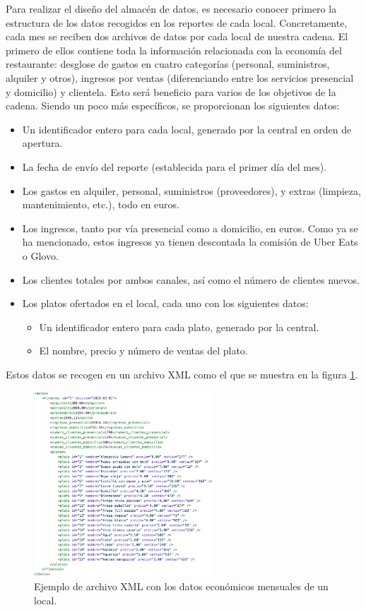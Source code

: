 \documentclass[12pt]{opticajnl}
\begin{document}
Para realizar el diseño del almacén de datos, es necesario conocer primero la estructura de los datos recogidos en los reportes de cada local. Concretamente, cada mes se reciben dos archivos de datos por cada local de nuestra cadena. El primero de ellos contiene toda la información relacionada con la economía del restaurante: desglose de gastos en cuatro categorías (personal, suministros, alquiler y otros), ingresos por ventas (diferenciando entre los servicios presencial y domicilio) y clientela. Esto será beneficio para varios de los objetivos de la cadena. Siendo un poco más específicos, se proporcionan los siguientes datos:
\begin{itemize}
\item Un identificador entero para cada local, generado por la central en orden de apertura.
\item La fecha de envío del reporte (establecida para el primer día del mes). 
\item Los gastos en alquiler, personal, suministros (proveedores), y extras (limpieza, mantenimiento, etc.), todo en euros.
\item Los ingresos, tanto por vía presencial como a domicilio, en euros. Como ya se ha mencionado, estos ingresos ya tienen descontada la comisión de Uber Eats o Glovo.
\item Los clientes totales por ambos canales, así como el número de clientes nuevos.
\item Los platos ofertados en el local, cada uno con los siguientes datos:
\begin{itemize}
\item Un identificador entero para cada plato, generado por la central.
\item El nombre, precio y número de ventas del plato. 
\end{itemize}
\end{itemize}

Estos datos se recogen en un archivo XML como el que se muestra en la figura \ref{fig:xml_economico}.

\begin{figure}[h]
\centering
\includegraphics[width=0.6\textwidth]{fotos/1.png}
\caption{Ejemplo de archivo XML con los datos económicos mensuales de un local.}
\label{fig:xml_economico}
\end{figure}
\end{document}
